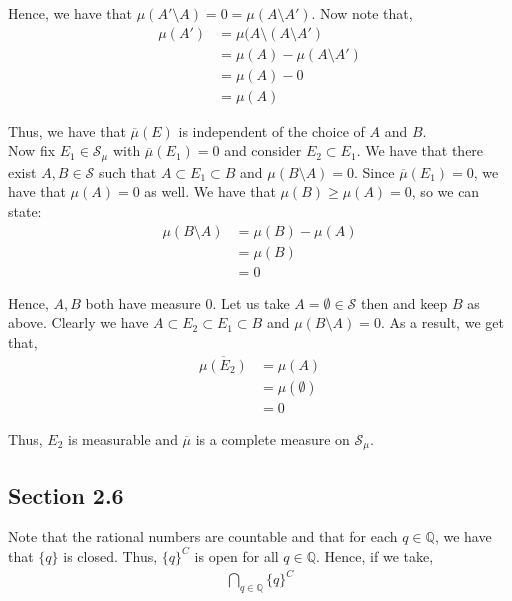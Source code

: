 \documentclass[12pt]{article}
\newenvironment{problem}[2][Problem]{\begin{trivlist}
\item[\hskip \labelsep {\bfseries #1}\hskip \labelsep {\bfseries #2.}]}{\end{trivlist}}
\begin{document}
Hence, we have that $\mu(A' \setminus A) = 0 = \mu(A \setminus A')$. Now note that,
\begin{align*}
\mu(A') &= \mu(A \setminus (A \setminus A')\\
&= \mu(A) - \mu(A \setminus A')\\
&= \mu(A) - 0\\
&= \mu(A)
\end{align*}

Thus, we have that $\overline{\mu}(E)$ is independent of the choice of $A$ and $B$.\\

Now fix $E_1 \in \mathcal{S}_{\mu}$ with $\overline{\mu}(E_1) = 0$ and consider $E_2 \subset E_1$. We have that there exist $A, B \in \mathcal{S}$ such that $A \subset E_1 \subset B$ and $\mu(B \setminus A) = 0$. Since $\overline{\mu}(E_1) = 0$, we have that $\mu(A) = 0$ as well. We have that $\mu(B) \geq \mu(A) = 0$, so we can state:
\begin{align*}
\mu(B \setminus A) &= \mu(B) - \mu(A)\\
&= \mu(B)\\
&= 0
\end{align*}

Hence, $A, B$ both have measure $0$. Let us take $A = \emptyset \in \mathcal{S}$ then and keep $B$ as above. Clearly we have $A \subset E_2 \subset E_1 \subset B$ and $\mu(B \setminus A) = 0$. As a result, we get that,
\begin{align*}
\overline{\mu(E_2)} &= \mu(A)\\
&= \mu(\emptyset)\\
&= 0
\end{align*}

Thus, $E_2$ is measurable and $\overline{\mu}$ is a complete measure on $\mathcal{S}_{\mu}$.


\subsection{Section 2.6}

\begin{problem}{2}
\end{problem}

Note that the rational numbers are countable and that for each $q \in \mathbb{Q}$, we have that $\{q\}$ is closed. Thus, $\{q\}^C$ is open for all $q \in \mathbb{Q}$. Hence, if we take,
\begin{align*}
\bigcap_{q \in \mathbb{Q}} \{q\}^C
\end{align*}
\end{document}
